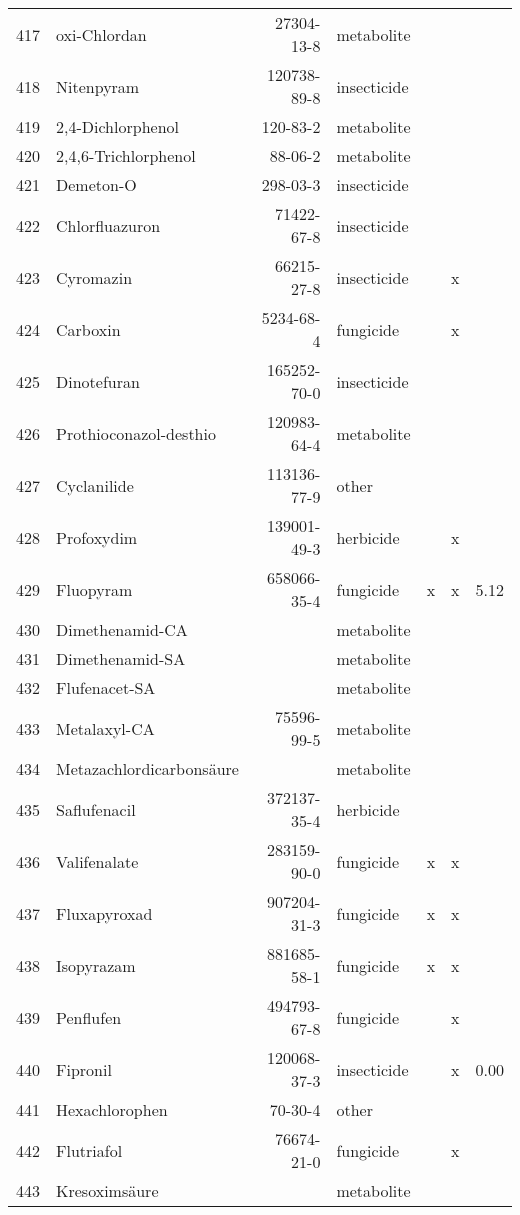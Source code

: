 \begin{longtable}{lp{3cm}rlp{0.5cm}p{0.5cm}p{1cm}}
  417 & oxi-Chlordan & 27304-13-8 & metabolite &  &  &  \\ 
  418 & Nitenpyram & 120738-89-8 & insecticide &  &  &  \\ 
  419 & 2,4-Dichlorphenol & 120-83-2 & metabolite &  &  &  \\ 
  420 & 2,4,6-Trichlorphenol & 88-06-2 & metabolite &  &  &  \\ 
  421 & Demeton-O & 298-03-3 & insecticide &  &  &  \\ 
  422 & Chlorfluazuron & 71422-67-8 & insecticide &  &  &  \\ 
  423 & Cyromazin & 66215-27-8 & insecticide &  & x &  \\ 
  424 & Carboxin & 5234-68-4 & fungicide &  & x &  \\ 
  425 & Dinotefuran & 165252-70-0 & insecticide &  &  &  \\ 
  426 & Prothioconazol-desthio & 120983-64-4 & metabolite &  &  &  \\ 
  427 & Cyclanilide & 113136-77-9 & other &  &  &  \\ 
  428 & Profoxydim & 139001-49-3 & herbicide &  & x &  \\ 
  429 & Fluopyram & 658066-35-4 & fungicide & x & x & 5.12 \\ 
  430 & Dimethenamid-CA &  & metabolite &  &  &  \\ 
  431 & Dimethenamid-SA &  & metabolite &  &  &  \\ 
  432 & Flufenacet-SA &  & metabolite &  &  &  \\ 
  433 & Metalaxyl-CA & 75596-99-5 & metabolite &  &  &  \\ 
  434 & Metazachlordicarbonsäure &  & metabolite &  &  &  \\ 
  435 & Saflufenacil & 372137-35-4 & herbicide &  &  &  \\ 
  436 & Valifenalate & 283159-90-0 & fungicide & x & x &  \\ 
  437 & Fluxapyroxad & 907204-31-3 & fungicide & x & x &  \\ 
  438 & Isopyrazam & 881685-58-1 & fungicide & x & x &  \\ 
  439 & Penflufen & 494793-67-8 & fungicide &  & x &  \\ 
  440 & Fipronil & 120068-37-3 & insecticide &  & x & 0.00 \\ 
  441 & Hexachlorophen & 70-30-4 & other &  &  &  \\ 
  442 & Flutriafol & 76674-21-0 & fungicide &  & x &  \\ 
  443 & Kresoximsäure &  & metabolite &  &  &  \\ 

\end{longtable}
